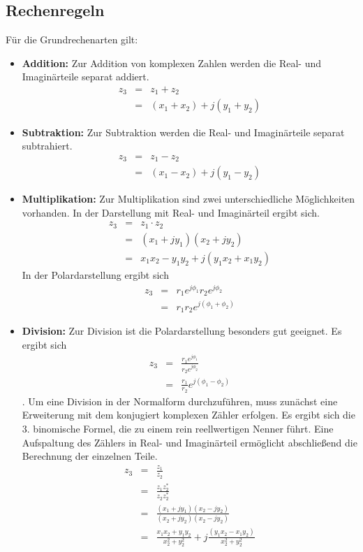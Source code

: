 \subsection{Rechenregeln}
Für die Grundrechenarten gilt:
\begin{itemize}
    \item {\bf Addition:} Zur Addition von komplexen Zahlen werden
    die Real- und Imaginärteile separat addiert.
    \begin{eqnarray}\label{eq:Addition}
    z_3 &=& z_1 + z_2\\
     & = & (x_1 + x_2) + j (y_1 + y_2)
    \end{eqnarray}
    \item {\bf Subtraktion:} Zur Subtraktion werden
    die Real- und Imaginärteile separat subtrahiert.
    \begin{eqnarray}\label{eq:Subtraktion}
    z_3 &=& z_1 - z_2\\
     & = & (x_1 - x_2) + j (y_1 - y_2)
    \end{eqnarray}
    \item {\bf Multiplikation:} Zur Multiplikation sind zwei unterschiedliche
    Möglichkeiten vorhanden. In der Darstellung mit Real- und Imaginärteil ergibt sich.
    \begin{eqnarray}\label{eq:Multiplikation}
    z_3 &=& z_1 \cdot z_2\\
     & = & (x_1 + j y_1) (x_2 + j y_2)\\
     & = & x_1 x_2 - y_1 y_2 + j(y_1x_2 + x_1 y_2)
    \end{eqnarray}
    In der Polardarstellung ergibt sich
    \begin{eqnarray}\label{eq:Multiplikation_Polar}
    z_3 &=& r_1 e^{j\phi_1} r_2e^{j\phi_2}\\
     & = & r_1 r_2 e^{j(\phi_1+\phi_2)}
    \end{eqnarray}

    \item {\bf Division:} Zur Division ist die
    Polardarstellung besonders gut geeignet. Es ergibt sich
    \begin{eqnarray}\label{eq:Division_Polar}
    z_3 &=& \frac{r_1 e^{j\phi_1}} {r_2e^{j\phi_2}}\\
     & = & \frac{r_1} {r_2} e^{j(\phi_1-\phi_2)}
    \end{eqnarray}.
    Um eine Division in der Normalform durchzuführen, muss
    zunächst eine Erweiterung mit dem konjugiert komplexen Zähler
    erfolgen. Es ergibt sich die 3. binomische Formel, die zu
    einem rein reellwertigen Nenner führt. Eine Aufspaltung des
    Zählers in Real- und Imaginärteil ermöglicht abschließend die
    Berechnung der einzelnen Teile.
    \begin{eqnarray}\label{eq:Division}
    z_3 &=& \frac{z_1}{z_2}\\
     & = & \frac{z_1z_2^{\ast}}{z_2 z_2^{\ast}}\\
     & = & \frac{(x_1 + j y_1)(x_2 - j y_2)}{(x_2 + j y_2)(x_2 - j
     y_2)}\\
     & = & \frac{x_1x_2 + y_1y_2}{x_2^2 +
     y_2^2} + j \frac{(y_1 x_2 - x_1 y_2)}{x_2^2 +
     y_2^2}
    \end{eqnarray}
\end{itemize}
